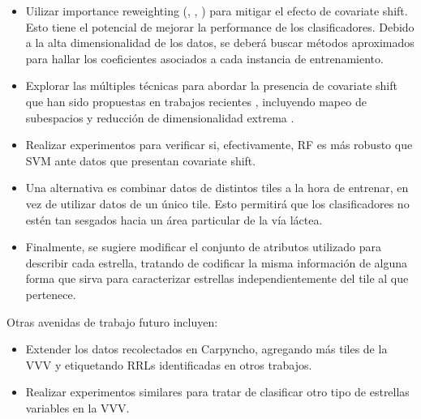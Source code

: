 \begin{itemize}
\item Uilizar importance reweighting (\cite{kouw2019introduction}, \cite{non-stationary} , \cite{GeetaDharani2019CovariateSA}) para mitigar el efecto de covariate shift. Esto tiene el potencial de mejorar la performance de los clasificadores. Debido a la alta dimensionalidad de los datos, se deberá buscar métodos aproximados para hallar los coeficientes asociados a cada instancia de entrenamiento.
\item Explorar las múltiples técnicas para abordar la presencia de covariate shift que han sido propuestas en trabajos recientes \cite{GeetaDharani2019CovariateSA}, incluyendo mapeo de subespacios \cite{kouw2019introduction} y reducción de dimensionalidad extrema \cite{wang2018extreme}.
\item Realizar experimentos para verificar si, efectivamente, RF es más robusto que SVM ante datos que presentan covariate shift.
\item Una alternativa es combinar datos de distintos tiles a la hora de entrenar, en vez de utilizar datos de un único tile. Esto permitirá que los clasificadores no estén tan sesgados hacia un área particular de la vía láctea. 
\item Finalmente, se sugiere modificar el conjunto de atributos utilizado para describir cada estrella, tratando de codificar la misma información de alguna forma que sirva para caracterizar estrellas independientemente del tile al que pertenece.
\end{itemize}

Otras avenidas de trabajo futuro incluyen:

\begin{itemize}
\item Extender los datos recolectados en Carpyncho, agregando más tiles de la VVV y etiquetando RRLs identificadas en otros trabajos.
\item Realizar experimentos similares para tratar de clasificar otro tipo de estrellas variables en la VVV.
\end{itemize}



